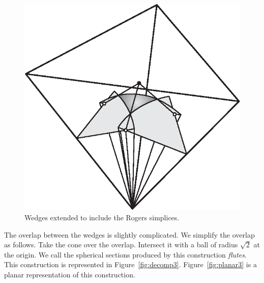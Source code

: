 \begin{figure}
\begin{center}
\includegraphics{PS/decomp2}
\end{center}
\caption{Wedges extended to include the Rogers simplices.}
\label{fig:decomp2}
\end{figure}

The overlap between the wedges is slightly complicated.  We
simplify the overlap as follows.  Take the cone over the overlap.
Intersect it with a ball of radius $\sqrt{2}$ at the origin.
We call the spherical sections produced by this construction
{\em flutes}.  This construction is represented in
Figure~\ref{fig:decomp3}.  Figure~\ref{fig:planar3}
is a planar representation of this construction.

